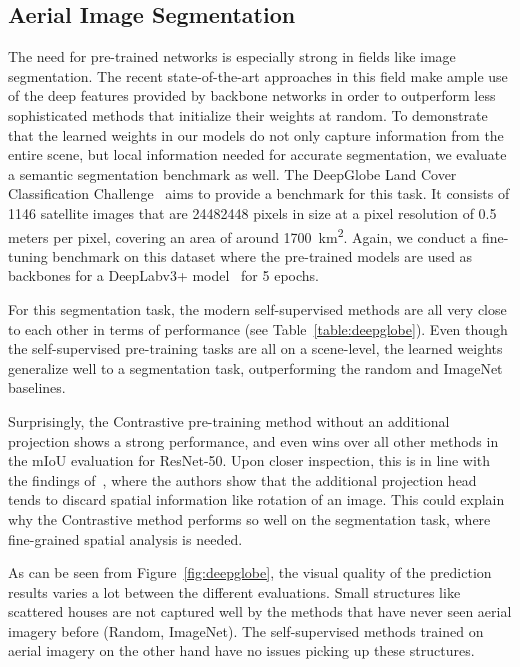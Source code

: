 \documentclass[journal]{IEEEtran}
\begin{document}
\subsection{Aerial Image Segmentation}
The need for pre-trained networks is especially
strong in fields like image segmentation.
The recent state-of-the-art approaches in this field make ample
use of the deep features provided by backbone networks
in order to outperform less sophisticated methods that initialize
their weights at random.
To demonstrate that the learned weights in our models do not only capture
information from the entire scene,
but local information needed for accurate segmentation,
we evaluate a semantic segmentation benchmark as well.
The DeepGlobe Land Cover Classification Challenge~\cite{deepglobe}
aims to provide a benchmark for this task.
It consists of 1146 satellite images that are 24482448
pixels in size at a pixel resolution of 0.5 meters per pixel,
covering an area of around \SI{1700}{\square\km}.
Again, we conduct a fine-tuning benchmark on this dataset
where the pre-trained models are used as backbones for
a DeepLabv3+ model~\cite{ferrari_encoder-decoder_2018}
for 5 epochs.

For this segmentation task, the modern self-supervised methods
are all very close to each other
in terms of performance (see Table~\ref{table:deepglobe}).
Even though the self-supervised pre-training tasks are all
on a scene-level,
the learned weights generalize well to a segmentation task,
outperforming the random and ImageNet baselines.

Surprisingly, the Contrastive pre-training method without an additional
projection shows a strong performance,
and even wins over all other methods in the mIoU evaluation for ResNet-50.
Upon closer inspection, this is in line with the findings of~\cite{simclr},
where the authors show that the additional projection head tends to
discard spatial information like rotation of an image.
This could explain why the Contrastive method performs so well
on the segmentation task, 
where fine-grained spatial analysis is needed.

As can be seen from Figure~\ref{fig:deepglobe},
the visual quality of the prediction results varies a lot
between the different evaluations.
Small structures like scattered houses
are not captured well by the methods that have never seen
aerial imagery before (Random, ImageNet).
The self-supervised methods trained on aerial imagery
on the other hand have no issues picking up these structures.
\end{document}

